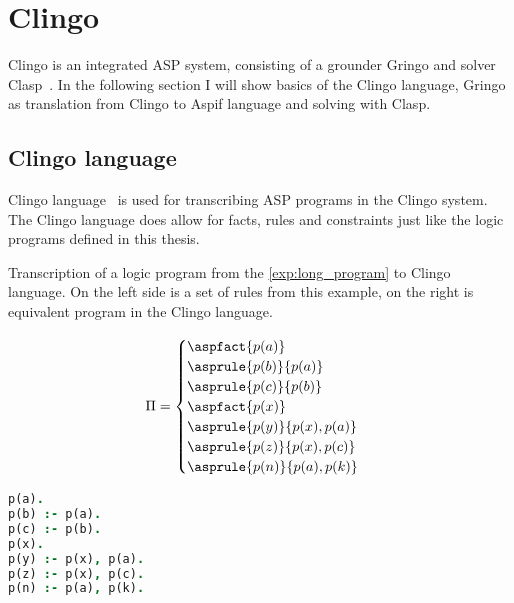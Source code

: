 \section{Clingo}\label{sec:clingo}

Clingo is an integrated ASP system, consisting of a grounder Gringo and solver
Clasp~\cite{aspEasy2016}. In the following section I will show basics of the
Clingo language, Gringo as translation from Clingo to Aspif language and
solving with Clasp.

\subsection{Clingo language}
Clingo language~\cite{gebser2019potassco} is used for transcribing ASP programs
in the Clingo system.
The Clingo language does allow for facts, rules and constraints just like
the logic programs defined in this thesis.

\begin{example}
    Transcription of a logic program from the \cref{exp:long_program} to Clingo language.
    On the left side is a set of rules from this example,
    on the right is equivalent program in the Clingo language.

    \begin{minipage}{.4\textwidth}
    \begin{equation*}
        \Pi =
            \begin{cases}
                \aspfact{p(a)}\\
                \asprule{p(b)}{p(a)}\\
                \asprule{p(c)}{p(b)}\\
                \aspfact{p(x)}\\
                \asprule{p(y)}{p(x), p(a)}\\
                \asprule{p(z)}{p(x), p(c)}\\
                \asprule{p(n)}{p(a), p(k)}\\
            \end{cases}
    \end{equation*}
    \end{minipage}
    \hfill
    \begin{minipage}{.4\textwidth}
        \vspace{1em}
        \begin{lstlisting}[language=Prolog, numbers=none, basicstyle=\linespread{1.25}\normalsize]
p(a).
p(b) :- p(a).
p(c) :- p(b).
p(x).
p(y) :- p(x), p(a).
p(z) :- p(x), p(c).
p(n) :- p(a), p(k).
\end{lstlisting}
    \end{minipage}
\end{example}

